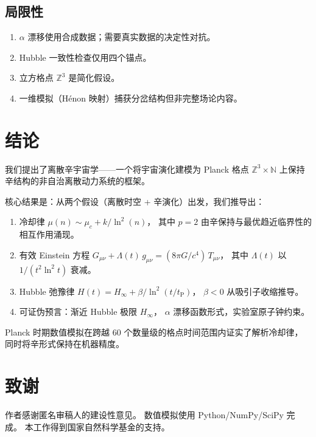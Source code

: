 \documentclass[a4paper,11pt]{article}
\theoremstyle{plain}
\newcommand{\lnq}{\ln^2}
\newcommand{\tP}{t_{\mathrm{P}}}
\newcommand{\Hinf}{H_{\infty}}
\newcommand{\ZZ}{\mathbb{Z}}
\newcommand{\NN}{\mathbb{N}}
\begin{document}
\subsection{局限性}

\begin{enumerate}
  \item $\alpha$ 漂移使用合成数据；需要真实数据的决定性对抗。
  \item Hubble 一致性检查仅用四个锚点。
  \item 立方格点 $\ZZ^3$ 是简化假设。
  \item 一维模拟（H\'enon 映射）捕获分岔结构但非完整场论内容。
\end{enumerate}

\section{结论}\label{sec:conclusion}

我们提出了离散辛宇宙学——一个将宇宙演化建模为
Planck 格点 $\ZZ^3 \times \NN$ 上保持辛结构的非自治离散动力系统的框架。

核心结果是：从两个假设（离散时空 + 辛演化）出发，我们推导出：
\begin{enumerate}
  \item 冷却律 $\mu(n) \sim \mu_c + k/\lnq(n)$，
    其中 $p=2$ 由辛保持与最优趋近临界性的相互作用涌现。
  \item 有效 Einstein 方程 $G_{\mu\nu} + \Lambda(t)\,g_{\mu\nu} = (8\pi G/c^4)\,T_{\mu\nu}$，
    其中 $\Lambda(t)$ 以 $1/(t^2\lnq t)$ 衰减。
  \item Hubble 弛豫律 $H(t) = \Hinf + \beta/\lnq(t/\tP)$，
    $\beta < 0$ 从吸引子收缩推导。
  \item 可证伪预言：渐近 Hubble 极限 $\Hinf$，
    $\alpha$ 漂移函数形式，实验室原子钟约束。
\end{enumerate}

Planck 时期数值模拟在跨越 60 个数量级的格点时间范围内证实了解析冷却律，
同时将辛形式保持在机器精度。

\section*{致谢}
作者感谢匿名审稿人的建设性意见。
数值模拟使用 Python/NumPy/SciPy 完成。
本工作得到国家自然科学基金的支持。
\end{document}
